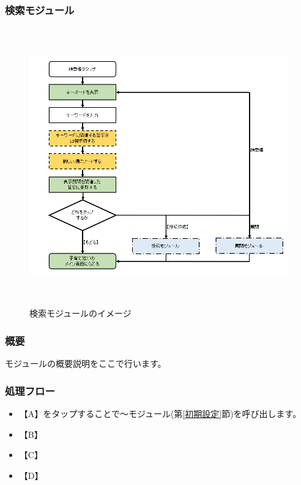 \documentclass[a4j]{jarticle}
\begin{document}
\subsubsection{検索モジュール\label{検索}} %
\begin{figure}[H]
    \begin{center}
      \includegraphics[height = 12.0cm] {子育て窓口_検索.PNG} %
    \caption {検索モジュールのイメージ}
    \label{functionselection}
    \end{center}
\end{figure}
\subsubsection*{概要}
モジュールの概要説明をここで行います。
\subsubsection*{処理フロー}
\begin{itemize}
\item 【A】をタップすることで～モジュール(第\ref{初期設定}節)を呼び出します。%
\item 【B】
\item 【C】
\item 【D】
\end{itemize}
\end{document}
